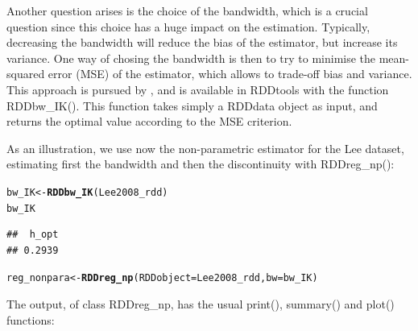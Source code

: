 \documentclass[english,nojss]{jss}\usepackage{graphicx, color}
\makeatletter
\newcommand{\hlfunctioncall}[1]{\textcolor[rgb]{0.501960784313725,0,0.329411764705882}{\textbf{#1}}}%
\newenvironment{kframe}{%
 \def\at@end@of@kframe{}%
 \ifinner\ifhmode%
  \def\at@end@of@kframe{\end{minipage}}%
  \begin{minipage}{\columnwidth}%
 \fi\fi%
 \def\FrameCommand##1{\hskip\@totalleftmargin \hskip-\fboxsep
 \colorbox{shadecolor}{##1}\hskip-\fboxsep
     \hskip-\linewidth \hskip-\@totalleftmargin \hskip\columnwidth}%
 \MakeFramed {\advance\hsize-\width
   \@totalleftmargin\z@ \linewidth\hsize
   \@setminipage}}%
 {\par\unskip\endMakeFramed%
 \at@end@of@kframe}
\newenvironment{knitrout}{}{} %
\makeatother
\begin{document}
Another question arises is the choice of the bandwidth, which is a
crucial question since this choice has a huge impact on the estimation.
Typically, decreasing the bandwidth will reduce the bias of the estimator,
but increase its variance. One way of chosing the bandwidth is then
to try to minimise the mean-squared error (MSE) of the estimator,
which allows to trade-off bias and variance. This approach is pursued
by \citet{ImbensKalyanaraman2012}, and is available in RDDtools with
the function RDDbw\_IK(). This function takes simply a RDDdata object
as input, and returns the optimal value according to the MSE criterion. 

As an illustration, we use now the non-parametric estimator for the
Lee dataset, estimating first the bandwidth and then the discontinuity
with RDDreg\_np():

\begin{knitrout}
\color{fgcolor}\begin{kframe}
\begin{alltt}
bw_IK <- \hlfunctioncall{RDDbw_IK}(Lee2008_rdd)
bw_IK
\end{alltt}
\begin{verbatim}
##  h_opt 
## 0.2939
\end{verbatim}
\begin{alltt}
reg_nonpara <- \hlfunctioncall{RDDreg_np}(RDDobject = Lee2008_rdd, bw = bw_IK)
\end{alltt}
\end{kframe}
\end{knitrout}


The output, of class RDDreg\_np, has the usual print(), summary()
and plot() functions:
\end{document}
